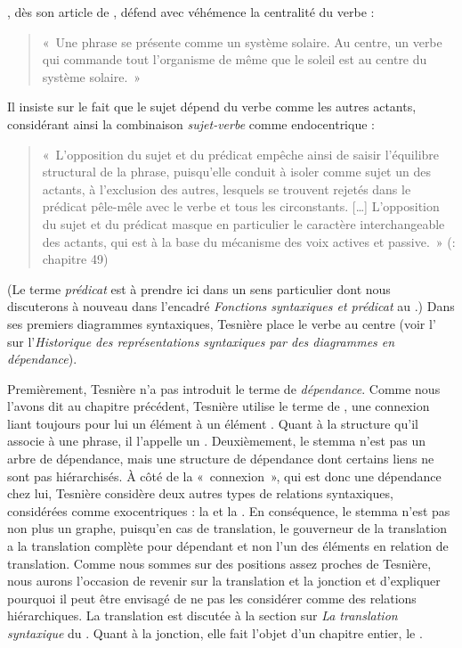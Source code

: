 {    , dès son article de \citeyear{tesniere1934comment}, défend avec véhémence la centralité du verbe : 
    \begin{quote}«~Une phrase se présente comme un système solaire. Au centre, un verbe qui commande tout l’organisme de même que le soleil est au centre du système solaire.~»\end{quote}
    Il insiste sur le fait que le sujet dépend du verbe comme les autres actants, considérant ainsi la combinaison \textit{sujet-verbe} comme endocentrique : 
    \begin{quote}«~L’opposition du sujet et du prédicat empêche ainsi de saisir l’équilibre structural de la phrase, puisqu’elle conduit à isoler comme sujet un des actants, à l’exclusion des autres, lesquels se trouvent rejetés dans le prédicat pêle-mêle avec le verbe et tous les circonstants. […] L’opposition du sujet et du prédicat masque en particulier le caractère interchangeable des actants, qui est à la base du mécanisme des voix actives et passive.~» (\citeyear{tesniere1959elements}: chapitre 49)\end{quote}
    (Le terme \textit{prédicat} est à prendre ici dans un sens particulier dont nous discuterons à nouveau dans l’encadré \textit{Fonctions syntaxiques et prédicat} au .) Dans ses premiers diagrammes syntaxiques, Tesnière place le verbe au centre (voir l' sur l'\textit{Historique des représentations syntaxiques par des diagrammes en dépendance}).

    Premièrement, Tesnière n’a pas introduit le terme de \textit{dépendance}. Comme nous l’avons dit au chapitre précédent, Tesnière utilise le terme de {}, une connexion liant toujours pour lui un élément  à un élément . Quant à la structure qu’il associe à une phrase, il l’appelle un . Deuxièmement, le stemma n’est pas un arbre de dépendance, mais une structure de dépendance dont certains liens ne sont pas hiérarchisés. À côté de la «~connexion~», qui est donc une dépendance chez lui, Tesnière considère deux autres types de relations syntaxiques, considérées comme exocentriques : la  et la . En conséquence, le stemma n’est pas non plus un graphe, puisqu’en cas de translation, le gouverneur de la translation a la translation complète pour dépendant et non l’un des éléments en relation de translation. Comme nous sommes sur des positions assez proches de Tesnière, nous aurons l’occasion de revenir sur la translation et la jonction et d’expliquer pourquoi il peut être envisagé de ne pas les considérer comme des relations hiérarchiques. La translation est discutée à la section sur \textit{La translation syntaxique} du . Quant à la jonction, elle fait l’objet d’un chapitre entier, le .

}
